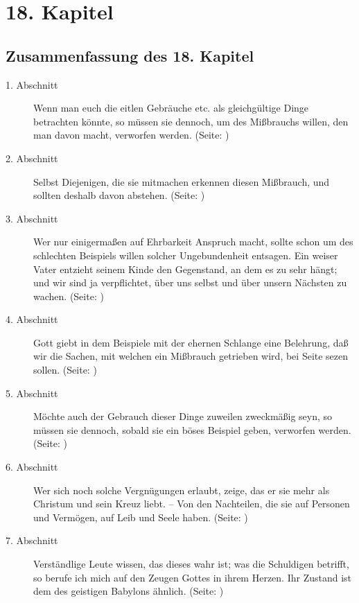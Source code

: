

\chapter{18. Kapitel} \label{kap18}
\section{Zusammenfassung des 18. Kapitel}
\small
\begin{description}
\item[1. Abschnitt] Wenn man euch die eitlen Gebräuche etc. als gleichgültige
Dinge betrachten könnte, so müssen sie dennoch, um des Mißbrauchs willen, den
man davon macht, verworfen werden. (Seite: \pageref{kap18_ab1})
\item[2. Abschnitt] Selbst Diejenigen, die sie mitmachen erkennen diesen
Mißbrauch, und sollten deshalb davon abstehen. (Seite: \pageref{kap18_ab2})
\item[3. Abschnitt] Wer nur einigermaßen auf Ehrbarkeit Anspruch macht, sollte
schon um des schlechten Beispiels willen solcher Ungebundenheit entsagen. Ein
weiser Vater entzieht seinem Kinde den Gegenstand, an dem es zu sehr hängt; und
wir sind ja verpflichtet, über uns selbst und über unsern Nächsten zu wachen. (Seite: \pageref{kap18_ab3})
\item[4. Abschnitt] Gott giebt in dem Beispiele mit der ehernen Schlange eine
Belehrung, daß wir die Sachen, mit welchen ein Mißbrauch getrieben wird, bei
Seite sezen sollen. (Seite: \pageref{kap18_ab4})
\item[5. Abschnitt] Möchte auch der Gebrauch dieser Dinge zuweilen zweckmäßig
seyn, so müssen sie dennoch, sobald sie ein böses Beispiel geben, verworfen
werden. (Seite: \pageref{kap18_ab5})
\item[6. Abschnitt] Wer sich noch solche Vergnügungen erlaubt, zeige, das er sie
mehr als Christum und sein Kreuz liebt. -- Von den Nachteilen, die sie auf
Personen und Vermögen, auf Leib und Seele haben. (Seite: \pageref{kap18_ab6})
\item[7. Abschnitt] Verständlige Leute wissen, das dieses wahr ist; was die
Schuldigen betrifft, so berufe ich mich auf den Zeugen Gottes in ihrem Herzen.
Ihr Zustand ist dem des geistigen Babylons ähnlich. (Seite: \pageref{kap18_ab7})

\end{description}
